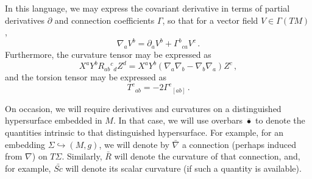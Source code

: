 \documentclass{article}
\theoremstyle{definition}
\theoremstyle{remark}
\begin{document}
In this language, we may express the covariant derivative in terms of partial derivatives $\partial$ and connection coefficients $\Gamma$, so that for a vector field $V \in \Gamma(TM)$,
$$\nabla_a V^b = \partial_a V^b + \Gamma^b{}_{ca} V^c\,.$$ 
Furthermore, the curvature tensor may be expressed as
$$X^a Y^b R_{ab}{}^c{}_d Z^d = X^a Y^b (\nabla_a \nabla_b - \nabla_b \nabla_a) Z^c\,,$$
and the torsion tensor may be expressed as
$$T^c{}_{ab} = -2 \Gamma^c{}_{[ab]}\,.$$

On occasion, we will require derivatives and curvatures on a distinguished hypersurface embedded in $M$. In that case, we will use overbars $\bar{\bullet}$ to denote the quantities intrinsic to that distinguished hypersurface. For example, for an embedding $\Sigma \hookrightarrow (M,g)$, we will denote by $\bar{\nabla}$ a connection (perhaps induced from $\nabla$) on $T \Sigma$. Similarly, $\bar{R}$ will denote the curvature of that connection, and, for example, $\bar{Sc}$ will denote its scalar curvature (if such a quantity is available).

\bigskip
\end{document}
